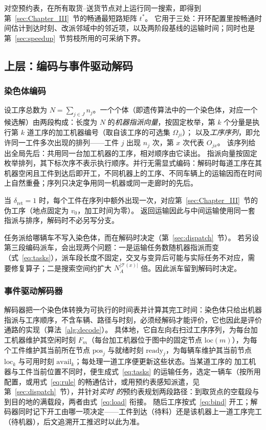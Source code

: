 \documentclass[manuscript,screen,review]{acmart}
\begin{document}
对空预约表，在所有取货--送货节点对上运行同一搜索，即得到第~\ref{sec:Chapter_III}~节的畅通最短路矩阵 $t^{*}$。
它用于三处：开环配置里按畅通时间估计到达时刻、改派邻域中的邻近项，以及两阶段基线的运输时间；同时也是第~\ref{sec:speedup}~节剪枝所用的可采纳下界。


\subsection{上层：编码与事件驱动解码}
\label{sec:upper}

\subsubsection{染色体编码}
设工序总数为 $N=\sum_{j\in J}n_j$。一个个体（即遗传算法中的一个染色体，对应一个候选解）由两段构成：长度为 $N$ 的\emph{机器指派向量}，按固定枚举，第 $k$ 个分量是执行第 $k$ 道工序的加工机器编号（取自该工序的可选集 $\Omega_{ji}$）；
以及\emph{工序序列}，即允许同一工件多次出现的排列——工件 $j$ 出现 $n_j$ 次，第 $x$ 次代表 $O_{jx}$。
该序列给出全局先后：共用同一台加工机器的工序，相对顺序由它读出。
指派向量按固定枚举排列，其下标次序不表示执行顺序。并行无需显式编码：解码时每道工序在其机器空闲且工件到达后即开工，不同机器上的工序、不同车辆上的运输因而在时间上自然重叠；序列只决定争用同一机器或同一走廊时的先后。

当 $\delta_{\mathrm{ret}}=1$ 时，每个工件在序列中额外出现一次，对应第~\ref{sec:Chapter_III}~节的伪工序（地点固定为 $v_0$，加工时间为零）。
返回运输因此与中间运输使用同一套指派与排序，解码时不必另写分支。

任务派给哪辆车不写入染色体，而在解码时决定（第~\ref{sec:dispatch}~节）。
若另设第三段编码派车，会出现两个问题：一是运输任务数随机器指派而变（式~\eqref{eq:tasks}），派车段长度不固定，交叉与变异后可能与实际任务不对应，需要修复算子；二是搜索空间约扩大 $N_A^{|\mathcal{T}(x)|}$ 倍。因此派车留到解码时决定。


\subsubsection{事件驱动解码器}
解码器把一个染色体转换为可执行的时间表并计算其完工时间：染色体只给出机器指派与工序顺序，不含车辆、路径与时刻，必须经解码才能评价，它也因此是评价通路的实现（算法~\ref{alg:decode}）。
具体地，它自左向右扫过工序序列，为每台加工机器维护其空闲时刻 $F_m$（每台加工机器位于图中的固定节点 $\mathrm{loc}(m)$），为每个工件维护其当前所在节点 $\mathrm{pos}_j$ 与就绪时刻 $\mathrm{ready}_j$，为每辆车维护其当前节点 $\mathrm{loc}_k$ 与可用时刻 $\mathrm{avail}_k$；每处理一道工序便更新这些状态。当某道工序的
加工机器与工件当前位置不同时，便生成式~\eqref{eq:tasks} 的运输任务，选定一辆车（按所用配置，或用式~\eqref{eq:rule} 的畅通估计，或用预约表感知派遣，见第~\ref{sec:dispatch}~节），并针对\emph{实时
的}预约表规划两段路径：到取货点的空载段与到目的地的满载段，两者由式~\eqref{eq:load} 衔接。
随后工序按式~\eqref{eq:bind} 开工；解码器同时记下开工由哪一项决定——工件到达（待料）还是该机器上一道工序完工（待机器），后文追溯开工推迟时以此为准。
\end{document}

